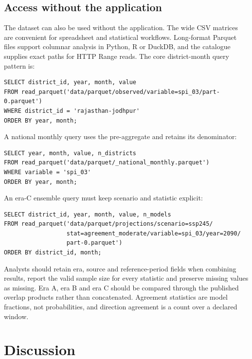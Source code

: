 \documentclass[10pt,a4paper]{article}
\begin{document}
\subsection*{Access without the application}
The dataset can also be used without the application. The wide CSV matrices are convenient for spreadsheet and statistical workflows. Long-format Parquet files support columnar analysis in Python, R or DuckDB, and the catalogue supplies exact paths for HTTP Range reads. The core district-month query pattern is:

\begin{verbatim}
SELECT district_id, year, month, value
FROM read_parquet('data/parquet/observed/variable=spi_03/part-0.parquet')
WHERE district_id = 'rajasthan-jodhpur'
ORDER BY year, month;
\end{verbatim}

A national monthly query uses the pre-aggregate and retains its denominator:

\begin{verbatim}
SELECT year, month, value, n_districts
FROM read_parquet('data/parquet/_national_monthly.parquet')
WHERE variable = 'spi_03'
ORDER BY year, month;
\end{verbatim}

An era-C ensemble query must keep scenario and statistic explicit:

\begin{verbatim}
SELECT district_id, year, month, value, n_models
FROM read_parquet('data/parquet/projections/scenario=ssp245/
                  stat=agreement_moderate/variable=spi_03/year=2090/
                  part-0.parquet')
ORDER BY district_id, month;
\end{verbatim}

Analysts should retain era, source and reference-period fields when combining results, report the valid sample size for every statistic and preserve missing values as missing. Era A, era B and era C should be compared through the published overlap products rather than concatenated. Agreement statistics are model fractions, not probabilities, and direction agreement is a count over a declared window.

\section*{Discussion}
\end{document}
